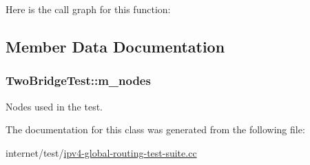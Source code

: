 Here is the call graph for this function\+:




\subsection{Member Data Documentation}
\subsubsection[{\texorpdfstring{m\+\_\+nodes}{m_nodes}}]{ Two\+Bridge\+Test\+::m\+\_\+nodes\hspace{0.3cm}{\ttfamily [private]}}\hypertarget{classTwoBridgeTest_af72518a9099a0db24ee51af9bc783c01}{}\label{classTwoBridgeTest_af72518a9099a0db24ee51af9bc783c01}


Nodes used in the test. 



The documentation for this class was generated from the following file\+:\begin{DoxyCompactItemize}
\item 
internet/test/\hyperlink{ipv4-global-routing-test-suite_8cc}{ipv4-\/global-\/routing-\/test-\/suite.\+cc}\end{DoxyCompactItemize}
